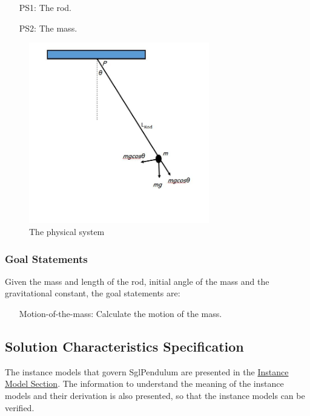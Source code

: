 \documentclass[12pt]{article}
\begin{document}
\begin{itemize}
\item[PS1:]{The rod.}
\item[PS2:]{The mass.}
\end{itemize}
\begin{figure}
\begin{center}
\includegraphics[width=0.7\textwidth]{../../../../datafiles/sglpendulum/sglpendulum.jpg}
\caption{The physical system}
\label{Figure:sglpendulum}
\end{center}
\end{figure}
\subsubsection{Goal Statements}
\label{Sec:GoalStmt}
Given the mass and length of the rod, initial angle of the mass and the gravitational constant, the goal statements are:

\begin{itemize}
\item[Motion-of-the-mass:\phantomsection\label{motionMass}]{Calculate the motion of the mass.}
\end{itemize}
\subsection{Solution Characteristics Specification}
\label{Sec:SolCharSpec}
The instance models that govern SglPendulum are presented in the \hyperref[Sec:IMs]{Instance Model Section}. The information to understand the meaning of the instance models and their derivation is also presented, so that the instance models can be verified.
\end{document}
